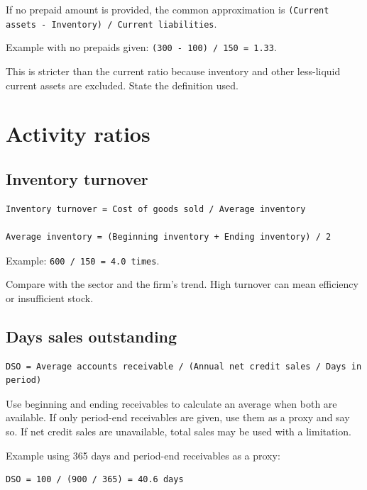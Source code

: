 \documentclass[11pt,letterpaper,oneside,openany]{book}
\begin{document}
If no prepaid amount is provided, the common approximation is \texttt{(Current assets - Inventory) / Current liabilities}.


Example with no prepaids given: \texttt{(300 - 100) / 150 = 1.33}.


This is stricter than the current ratio because inventory and other less-liquid current assets are excluded. State the definition used.


\section[Activity ratios]{Activity ratios}
\subsection[Inventory turnover]{Inventory turnover}
\begin{Verbatim}[fontsize=\small,breaklines=true,breakanywhere=true,frame=single,framesep=2mm]
Inventory turnover = Cost of goods sold / Average inventory

Average inventory = (Beginning inventory + Ending inventory) / 2
\end{Verbatim}

Example: \texttt{600 / 150 = 4.0 times}.


Compare with the sector and the firm's trend. High turnover can mean efficiency or insufficient stock.


\subsection[Days sales outstanding]{Days sales outstanding}
\begin{Verbatim}[fontsize=\small,breaklines=true,breakanywhere=true,frame=single,framesep=2mm]
DSO = Average accounts receivable / (Annual net credit sales / Days in period)
\end{Verbatim}

Use beginning and ending receivables to calculate an average when both are available. If only period-end receivables are given, use them as a proxy and say so. If net credit sales are unavailable, total sales may be used with a limitation.


Example using 365 days and period-end receivables as a proxy:


\begin{Verbatim}[fontsize=\small,breaklines=true,breakanywhere=true,frame=single,framesep=2mm]
DSO = 100 / (900 / 365) = 40.6 days
\end{Verbatim}
\end{document}
